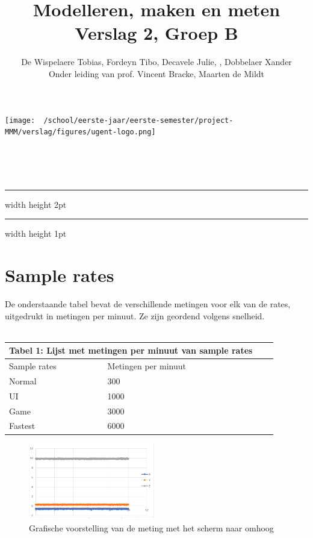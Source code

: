 \documentclass{article}
\title{Modelleren, maken en meten Verslag 2, Groep B}
\author{De Wispelaere Tobias, Fordeyn Tibo, Decavele Julie, , Dobbelaer Xander \\ Onder leiding van prof. Vincent Bracke, Maarten de Mildt}
\date{}
\makeatletter
\renewcommand{\maketitle}{
    \begin{center}
    \begin{minipage}{0.15\linewidth}%
    \texttt{[image: ~/school/eerste-jaar/eerste-semester/project-MMM/verslag/figures/ugent-logo.png]}
    \end{minipage}\hspace{10pt}
    \begin{minipage}{0.8\linewidth}%
    \begin{center}
            \vspace{.35cm}
            {\bf {\Huge \@title}}\\
            \vspace{.2cm}
            \textbf{ \Large \@author}  \\
            \vspace{.15cm}
            \@date \\
            \vspace{.1cm}
    \end{center}
    \end{minipage}%
    \end{center}
    \begin{center}
    \end{center}
\hrule width \hsize height 2pt \kern 1mm  \hrule width \hsize height 1pt
}
\makeatother
\begin{document}
\maketitle

\section{Sample rates}
De onderstaande tabel bevat de verschillende metingen voor elk van de rates, uitgedrukt in metingen per minuut. Ze zijn geordend volgens snelheid.\\
\\
\begin{tabular}{ |p{3cm}||p{4cm}|p{3cm}|p{3cm}|  }
 \hline
 \multicolumn{2}{|c|}{Tabel 1: Lijst met metingen per minuut van sample rates} \\
 \hline
 Sample rates&Metingen per minuut \\
 \hline
 Normal   & 300   \\
 UI&   1000  \\
 Game &3000 \\
 Fastest    &6000 \\
 \hline
\end{tabular}

\begin{figure}
    \label{wrap-fig:1}
    \includegraphics[width=5.5cm]{figures/andereAfb/waardenSchermBoven.png}
    \caption{Grafische voorstelling van de meting met het scherm naar omhoog}
\end{figure}
\end{document}
